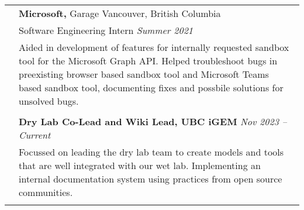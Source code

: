 \documentclass[letterpaper, 11pt]{article}
\begin{document}
\begin{longtable}{p{1.3in}p{4.8in}}
	 & {\textbf{Microsoft,}} Garage \hfill Vancouver, British Columbia                                                                                                                                                                                                                                                                                                                           \\
	 & Software Engineering Intern \hfill \textit{Summer 2021}                                                                                                                                                                                                                                                                                                                                   \\
	 & Aided in development of features for internally requested sandbox tool for the Microsoft Graph API. Helped troubleshoot bugs in preexisting browser based sandbox tool and Microsoft Teams based sandbox tool, documenting fixes and possbile solutions for unsolved bugs.                                                                                                                \\
	 &                                                                                                                                                                                                                                                                                                                                                                                           \\

	\color{Blue}{Service and outreach}
	 & \textbf{Dry Lab Co-Lead and Wiki Lead, UBC iGEM} \hfill \textit{Nov 2023 -- Current}                                                                                                                                                                                                                                                                                                      \\
	 & Focussed on leading the dry lab team to create models and tools that are well integrated with our wet lab. Implementing an internal documentation system using practices from open source communities.                                                                                                                                                                                    \\
	 &                                                                                                                                                                                                                                                                                                                                                                                           \\


\end{longtable}
\end{document}
